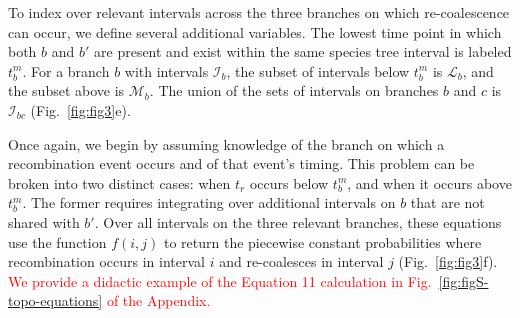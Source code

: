 \documentclass[11pt]{article}
\begin{document}
To index over relevant intervals across the three branches on which re-coalescence
can occur, we define several additional variables. The lowest time point in which both 
$b$ and $b'$ are present and exist within the same species tree interval is labeled 
$t_b^m$. For a branch $b$ with intervals $\mathcal{I}_b$, the subset of intervals 
below $t_b^m$ is $\mathcal{L}_b$, and the subset above is $\mathcal{M}_b$. 
The union of the sets of intervals on branches $b$ and $c$ is $\mathcal{I}_{bc}$
(Fig.~\ref{fig:fig3}e).

Once again, we begin by assuming knowledge of the branch on which a 
recombination event occurs and of that event's timing. This problem can be broken 
into two distinct cases: when $t_r$ occurs below $t_b^m$, and when it 
occurs above $t_b^m$. The former requires integrating over additional 
intervals on $b$ that are not shared with $b'$. Over all intervals
on the three relevant branches, these equations use the function 
$f(i,j)$ to return the piecewise constant probabilities where recombination 
occurs in interval $i$ and re-coalesces in interval $j$ (Fig.~\ref{fig:fig3}f).
\textcolor{red}{We provide a didactic example of the Equation 11
calculation in Fig.~\ref{fig:figS-topo-equations} of the Appendix.}


\end{document}
